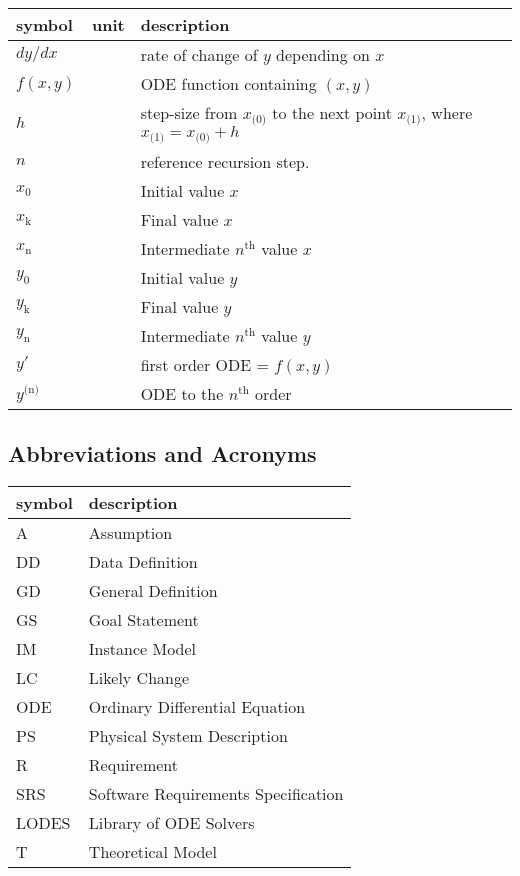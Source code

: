 \documentclass[12pt]{article}
\newcommand{\famname}{LODES} %
\newcommand{\famdesc}{Library of ODE Solvers}
\begin{document}
\renewcommand{\arraystretch}{1.2}
\noindent \begin{longtable*}{l l p{12cm}} \toprule
\textbf{symbol} & \textbf{unit} & \textbf{description}\\
\midrule
$dy/dx$ & \text {-} & rate of change of $y$ depending on $x$\\
$f(x, y)$ & \text{-} & ODE function containing $(x,y)$\\
$h$ & \text{-} & step-size from $x_\text{(0)}$ to the next point $x_\text{(1)}$, where $x_\text{(1)} = x_\text{(0)} + h$\\
$n$ & \text{-} & reference recursion step.\\
$x_\text{0}$ & \text{-} & Initial value $x$\\
$x_\text{k}$ & \text{-} & Final value $x$\\
$x_\text{n}$ & \text{-} & Intermediate $n^\text{th}$ value $x$\\
$y_\text{0}$ & \text{-} & Initial value $y$\\ 
$y_\text{k}$ & \text{-} & Final value $y$\\
$y_\text{n}$ & \text{-} & Intermediate $n^\text{th}$ value $y$\\ 
$y'$ & \text{-} & first order ODE = $f(x, y)$\\
$y^\text{(n)}$ & \text{-} & ODE to the $n^\text{th}$ order\\
\bottomrule
\end{longtable*}

\subsection{Abbreviations and Acronyms}

\renewcommand{\arraystretch}{1.2}
\begin{tabular}{l l} 
  \toprule		
  \textbf{symbol} & \textbf{description}\\
  \midrule 
  A & Assumption\\
  DD & Data Definition\\
  GD & General Definition\\
  GS & Goal Statement\\
  IM & Instance Model\\
  LC & Likely Change\\
  ODE & Ordinary Differential Equation\\
  PS & Physical System Description\\
  R & Requirement\\
  SRS & Software Requirements Specification\\
  \famname{} & \famdesc{}\\
  T & Theoretical Model\\
  \bottomrule
\end{tabular}\\
\end{document}

